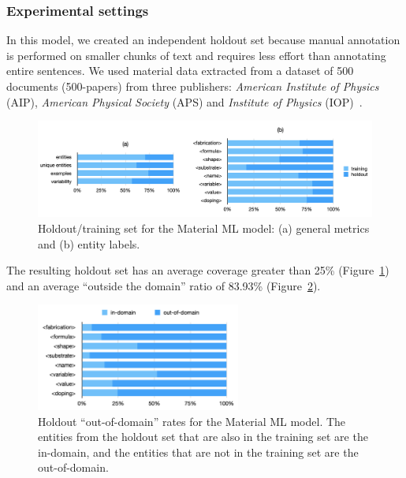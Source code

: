 \subsubsection{Experimental settings}

In this model, we created an independent holdout set because manual annotation is performed on smaller chunks of text and requires less effort than annotating entire sentences.
We used material data extracted from a dataset of 500 documents (500-papers) from three publishers: \textit{American Institute of Physics} (AIP), \textit{American Physical Society} (APS) and \textit{Institute of Physics} (IOP)~\cite{foppiano2019proposal}.

\begin{figure}[ht]
    \centering
    \includegraphics[width=\textwidth]{figures/automatic_extraction_supercon/material-holdout-training-set}
    \caption{Holdout/training set for the Material ML model: (a) general metrics and (b) entity labels.}
    \label{fig:material-training-holdout-set-distribution}
\end{figure}

The resulting holdout set has an average coverage greater than 25\% (Figure~\ref{fig:material-training-holdout-set-distribution}) and an average ``outside the domain'' ratio of 83.93\% (Figure~\ref{fig:material-out-domain-holdout}).

\begin{figure}[ht]
    \centering
    \includegraphics[width=0.6\textwidth]{figures/automatic_extraction_supercon/material-out-domain-holdout-unique}
    \caption{Holdout ``out-of-domain'' rates for the Material ML model. The entities from the holdout set that are also in the training set are the in-domain, and the entities that are not in the training set are the out-of-domain.}
    \label{fig:material-out-domain-holdout}
\end{figure}


